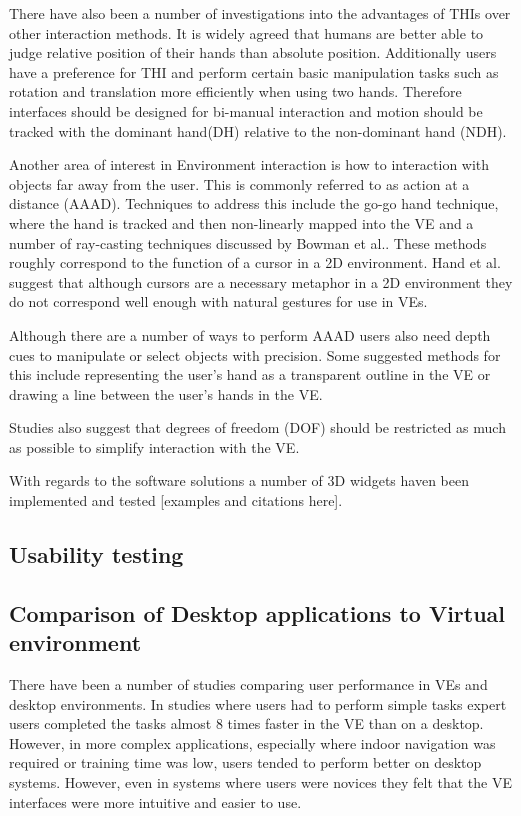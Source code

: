 \documentclass{sig-alternate-05-2015}
\begin{document}
 There have also been a number of investigations into the advantages of THIs over other interaction methods. It is widely agreed that humans are better able to judge relative position of their hands than absolute position.\cite{Bowman1998, Buxton1986} Additionally users have a preference for THI\cite{Buxton1986} and perform certain basic manipulation tasks such as rotation and translation more efficiently when using two hands.\cite{Schultheis2012,Balakrishnan1999} Therefore interfaces should be designed for bi-manual interaction and motion should be tracked with the dominant hand(DH) relative to the non-dominant hand (NDH).\cite{Hinckley1994}
 
 Another area of interest in Environment interaction is how to interaction with objects far away from the user. This is commonly referred to as action at a distance (AAAD). Techniques to address this include the go-go hand technique\cite{Poupyrev1996}, where the hand is tracked and then non-linearly mapped into the VE and a number of ray-casting techniques discussed by Bowman et al.\cite{Bowman2001}. These methods roughly correspond to the function of a cursor in a 2D environment. Hand et al. suggest that although cursors are a necessary metaphor in a 2D environment they do not correspond well enough with natural gestures for use in VEs.\cite{Hand1997}
 
 Although there are a number of ways to perform AAAD users also need depth cues to manipulate or select objects with precision.\cite{Schultheis2012} Some suggested methods for this include representing the user's hand as a transparent outline in the VE\cite{Hinckley1994} or drawing a line between the user's hands in the VE.\cite{Schultheis2012}
 
 
 Studies also suggest that degrees of freedom (DOF) should be restricted as much as possible to simplify interaction with the VE.\cite{Bowman2001}
 
 
  With regards to the software solutions a number of 3D widgets haven been implemented and tested [examples and citations here].
 

\subsection{Usability testing}
\subsection{Comparison of Desktop applications to Virtual environment}
There have been a number of studies comparing user performance in VEs and desktop environments. In studies where users had to perform simple tasks expert users completed the tasks almost 8 times faster in the VE than on a desktop.\cite{Schultheis2012} However, in more complex applications, especially where indoor navigation was required or training time was low, users tended to perform better on desktop systems\cite{SousaSantos2009}. However, even in systems where users were novices they felt that the VE interfaces were more intuitive and easier to use\cite{Toma2012}.
\end{document}
